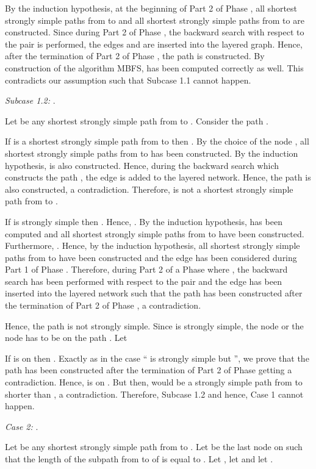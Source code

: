 \documentclass[12pt,twoside,a4paper]{article}
\begin{document}
By the induction hypothesis, at the beginning of Part 2 of Phase , all shortest strongly
simple paths from  to  and all shortest strongly simple paths from 
to  are constructed. Since during Part 2 of Phase , the backward search with 
respect to the pair  is performed, the edges
 and  are inserted into the layered graph. 
Hence, after the termination of Part 2 of Phase , the path 
 is constructed. By construction of the algorithm MBFS,
 has been computed correctly as well. This contradicts our assumption such that
Subcase 1.1 cannot happen.

\medskip
\noindent
{\em Subcase 1.2:} .

\medskip
Let  be any shortest strongly simple path from  to 
. Consider the path . 

If  is a shortest strongly simple path from  to  then 
. 
By the choice of the node , all shortest strongly simple paths from  to 
 has been constructed. By the induction hypothesis,  is also constructed. 
Hence, during the backward search which constructs the path ,
the edge  is added to the layered network. Hence, the path
 is also constructed, a contradiction.
Therefore,  is not a shortest strongly simple path from  to . 

If  is strongly simple
then . Hence, . 
By the induction hypothesis,  has been computed and all shortest strongly 
simple paths from  to  have been constructed. Furthermore, 
. Hence, by the induction hypothesis, all shortest 
strongly simple paths from  to  have been constructed and the edge 
 has been considered during Part 1 of Phase
. 
Therefore, during Part 2 of a Phase  where , the backward search has been performed
with respect to the pair  and the edge 
 has been inserted into the layered network such that the path 
has been constructed after the termination of Part 2 of Phase , a contradiction.

Hence, the path  is not strongly simple. Since 
is strongly simple, the node  or the node  has to be on the path . Let

If  is on  then . Exactly as in the case `` is strongly simple but
'', we prove that the path  has been constructed after the termination of 
Part 2 of Phase  getting a contradiction. Hence,  is on . But then, 
 would be a strongly simple path from  to  shorter than 
, a contradiction. Therefore, Subcase 1.2 and hence, Case 1 cannot happen.

\medskip
\noindent
{\em Case 2:} .

\medskip
Let  be any shortest strongly simple path from  to . 
Let  be the last node on  such that the length of the subpath from  
to  of  is equal to . Let ,
let  and let 
.
\end{document}
